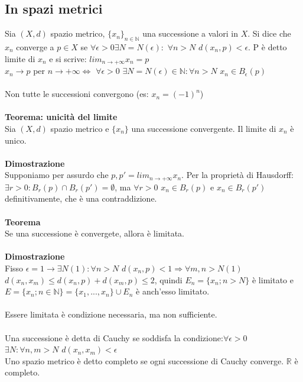 \documentclass{article}
\begin{document}
\subsection{In spazi metrici}
Sia $(X,d)$ spazio metrico, $\{x_n\}_{n\in\mathds{N}}$ una successione a valori in $X$. Si dice che $x_n$ converge a $p\in X$ se $\forall\epsilon>0 \exists N=N(\epsilon):$ $\forall n>N$ $d(x_n,p)<\epsilon$. P è detto limite di $x_n$ e si scrive: $lim_{n\rightarrow+\infty}x_n=p$\\
$x_n\rightarrow p$ per $n\rightarrow+\infty\Leftrightarrow$ $\forall\epsilon>0$ $\exists N=N(\epsilon)\in\mathds{N}: \forall n>N$ $x_n \in B_\epsilon(p)$\\\\
Non tutte le successioni convergono (es: $x_n=(-1)^n$)\\\\
\textbf{Teorema: unicità del limite}\\
Sia $(X,d)$ spazio metrico e $\{x_n\}$ una successione convergente. Il limite di $x_n$ è unico.\\\\
\textbf{Dimostrazione}\\
Supponiamo per assurdo che $p,p'=lim_{n\rightarrow+\infty}x_n$. Per la proprietà di Hausdorff: $\exists r>0: B_r(p)\cap B_r(p')=\emptyset$, ma $\forall r>0$ $x_n\in B_r(p)$ e $x_n\in B_r(p')$ definitivamente, che è una contraddizione.
\\\\
\textbf{Teorema}\\
Se una successione è convergete, allora è limitata.\\\\
\textbf{Dimostrazione}\\
Fisso $\epsilon=1\rightarrow\exists N(1):\forall n>N$ $d(x_n,p)<1\Rightarrow\forall m,n>N(1)$ $d(x_n,x_m)\leq d(x_n,p)+d(x_m,p)\leq 2$, quindi $E_n=\{x_n;n>N\}$ è limitato e $E=\{x_n;n\in\mathds{N}\}=\{x_1,...,x_n\}\cup E_n$ è anch'esso limitato.\\
\\
Essere limitata è condizione necessaria, ma non sufficiente.\\\\
Una successione è detta di Cauchy se soddisfa la condizione:$\forall\epsilon>0$ $\exists N:\forall n,m>N$ $d(x_n,x_m)<\epsilon$\\
Uno spazio metrico è detto completo se ogni successione di Cauchy converge. $\mathds{R}$ è completo.\\\\
\end{document}
